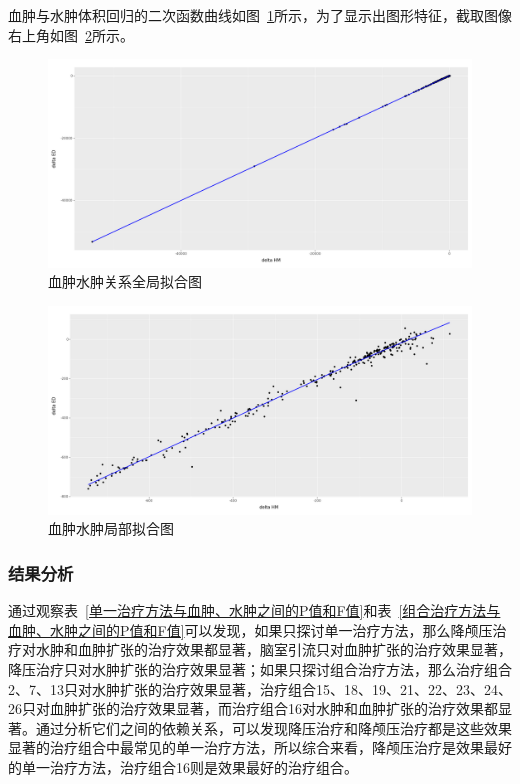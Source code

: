 \documentclass[bwprint]{gmcmthesis}
\begin{document}
血肿与水肿体积回归的二次函数曲线如图~\ref{血肿水肿关系全局拟合图}所示，为了显示出图形特征，截取图像右上角如图~\ref{血肿水肿局部拟合图}所示。

\begin{figure}[!h]
\centering
\includegraphics[width=\textwidth]{fig_me/血肿水肿关系全局拟合图.png}
\caption{血肿水肿关系全局拟合图}
\label{血肿水肿关系全局拟合图}
\end{figure}

\begin{figure}[!h]
\centering
\includegraphics[width=\textwidth]{fig_me/血肿水肿局部拟合图.png}
\caption{血肿水肿局部拟合图}
\label{血肿水肿局部拟合图}
\end{figure}

\subsubsection{结果分析}

通过观察表~\ref{单一治疗方法与血肿、水肿之间的P值和F值}和表~\ref{组合治疗方法与血肿、水肿之间的P值和F值}可以发现，如果只探讨单一治疗方法，那么降颅压治疗对水肿和血肿扩张的治疗效果都显著，脑室引流只对血肿扩张的治疗效果显著，降压治疗只对水肿扩张的治疗效果显著；如果只探讨组合治疗方法，那么治疗组合2、7、13只对水肿扩张的治疗效果显著，治疗组合15、18、19、21、22、23、24、26只对血肿扩张的治疗效果显著，而治疗组合16对水肿和血肿扩张的治疗效果都显著。通过分析它们之间的依赖关系，可以发现降压治疗和降颅压治疗都是这些效果显著的治疗组合中最常见的单一治疗方法，所以综合来看，降颅压治疗是效果最好的单一治疗方法，治疗组合16则是效果最好的治疗组合。
\end{document}
